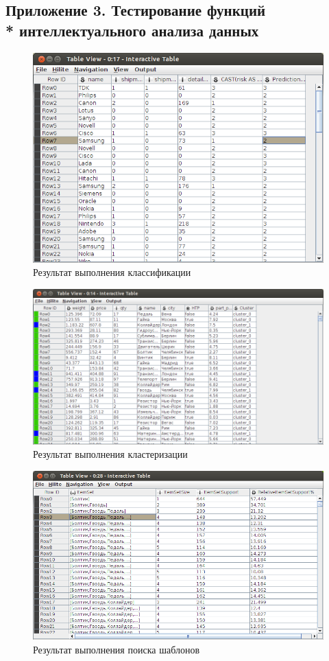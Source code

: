 \newpage
\subsection{Приложение 3. Тестирование функций\\* интеллектуального анализа данных}

\begin{figure}[h]
  \centering
  \includegraphics[scale=0.4]{classification.png}
  \caption{Результат выполнения классификации}
  \label{knime-classification}
\end{figure}

\begin{figure}[h]
  \centering
  \includegraphics[scale=0.4]{clusters.png}
  \caption{Результат выполнения кластеризации}
  \label{knime-clasterisation}
\end{figure}

\begin{figure}[h]
  \centering
  \includegraphics[scale=0.4]{freq_patterns.png}
  \caption{Результат выполнения поиска шаблонов}
  \label{knime-patterns}
\end{figure}

